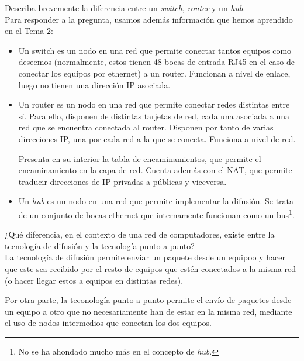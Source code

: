 \begin{ejercicio}
    Describa brevemente la diferencia entre un \textit{switch}, \textit{router} y un \textit{hub}.\\

    Para responder a la pregunta, usamos además información que hemos aprendido en el Tema 2:
    \begin{itemize}
        \item Un switch es un nodo en una red que permite conectar tantos equipos como deseemos (normalmente, estos tienen 48 bocas de entrada RJ45 en el caso de conectar los equipos por ethernet) a un router. Funcionan a nivel de enlace, luego no tienen una dirección IP asociada.
        \item Un router es un nodo en una red que permite conectar redes distintas entre sí. Para ello, disponen de distintas tarjetas de red, cada una asociada a una red que se encuentra conectada al router. Disponen por tanto de varias direcciones IP, una por cada red a la que se conecta. Funciona a nivel de red.

            Presenta en su interior la tabla de encaminamientos, que permite el encaminamiento en la capa de red. Cuenta además con el NAT, que permite traducir direcciones de IP privadas a públicas y viceversa.
        \item Un \textit{hub} es un nodo en una red que permite implementar la difusión. Se trata de un conjunto de bocas ethernet que internamente funcionan como un bus\footnote{No se ha ahondado mucho más en el concepto de \textit{hub}.}.
    \end{itemize}
\end{ejercicio}

\begin{ejercicio}
    ¿Qué diferencia, en el contexto de una red de computadores, existe entre la tecnología de difusión y la tecnología punto-a-punto?\\

    La tecnología de difusión permite enviar un paquete desde un equipoo y hacer que este sea recibido por el resto de equipos que estén conectados a la misma red (o hacer llegar estos a equipos en distintas redes).

    Por otra parte, la teconología punto-a-punto permite el envío de paquetes desde un equipo a otro que no necesariamente han de estar en la misma red, mediante el uso de nodos intermedios que conectan los dos equipos.
\end{ejercicio}

